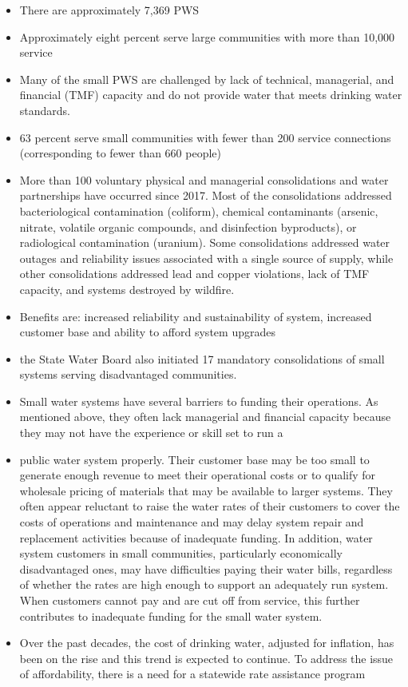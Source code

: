 \begin{itemize}
\item There are approximately 7,369 PWS
\item Approximately eight percent serve large communities with more than 10,000 service
\item Many of the small PWS are challenged by lack of technical, managerial, and financial (TMF) capacity and do not provide water that meets drinking water standards.
\item 63 percent serve small communities with fewer than 200 service connections (corresponding to fewer than 660 people)
\item More than 100 voluntary physical and managerial consolidations and water partnerships have occurred since 2017. Most of the consolidations addressed bacteriological contamination (coliform), chemical contaminants (arsenic, nitrate, volatile organic compounds, and disinfection byproducts), or radiological contamination (uranium). Some consolidations addressed water outages and reliability issues associated with a single source of supply, while other consolidations addressed lead and copper violations, lack of TMF capacity, and systems destroyed by wildfire.
\item Benefits are: increased reliability and sustainability of system, increased customer base and ability to afford system upgrades
\item the State Water Board also initiated 17 mandatory consolidations of small systems serving disadvantaged communities.

\item Small water systems have several barriers to funding their operations. As mentioned above, they often lack managerial and financial capacity because they may not have the experience or skill set to run a
\item public water system properly. Their customer base may be too small to generate enough revenue to meet their operational costs or to qualify for wholesale pricing of materials that may be available to larger systems. They often appear reluctant to raise the water rates of their customers to cover the costs of operations and maintenance and may delay system repair and replacement activities because of inadequate funding.
In addition, water system customers in small communities, particularly economically disadvantaged ones, may have difficulties paying their water bills, regardless of whether the rates are high enough to support an adequately run system. When customers cannot pay and are cut off from service, this further contributes to inadequate funding for the small water system.
\item Over the past decades, the cost of drinking water, adjusted for inflation, has been on the rise and this trend is expected to continue. To address the issue of affordability, there is a need for a statewide rate assistance program
\end{itemize}
